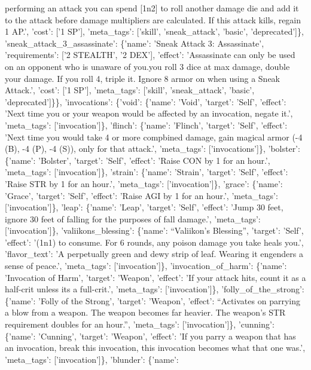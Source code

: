 \documentclass[
  letterpaper,
  DIV=11,
  numbers=noendperiod]{scrartcl}
\begin{document}
{performing an attack you can spend {[}1n2{]} to roll another damage die
and add it to the attack before damage multipliers are calculated. If
this attack kills, regain 1 AP.', 'cost': {[}'1 SP'{]}, 'meta\_tags':
{[}'skill', 'sneak\_attack', 'basic', 'deprecated'{]}\},
'sneak\_attack\_3\_assassinate': \{'name': 'Sneak Attack 3:
Assassinate', 'requirements': {[}'2 STEALTH', '2 DEX'{]}, 'effect':
'Assassinate can only be used on an opponent who is unaware of
you.\n\nIf you roll 3 dice at max damage, double your damage. If you
roll 4, triple it. Ignore 8 armor on when using a Sneak Attack.',
'cost': {[}'1 SP'{]}, 'meta\_tags': {[}'skill', 'sneak\_attack',
'basic', 'deprecated'{]}\}\}, 'invocations': \{'void': \{'name': 'Void',
'target': 'Self', 'effect': 'Next time you or your weapon would be
affected by an invocation, negate it.', 'meta\_tags':
{[}'invocation'{]}\}, 'flinch': \{'name': 'Flinch', 'target': 'Self',
'effect': 'Next time you would take 4 or more compbined damage, gain
magical armor (-4 (B), -4 (P), -4 (S)), only for that attack.',
'meta\_tags': {[}'invocations'{]}\}, 'bolster': \{'name': 'Bolster',
'target': 'Self', 'effect': 'Raise CON by 1 for an hour.', 'meta\_tags':
{[}'invocation'{]}\}, 'strain': \{'name': 'Strain', 'target': 'Self',
'effect': 'Raise STR by 1 for an hour.', 'meta\_tags':
{[}'invocation'{]}\}, 'grace': \{'name': 'Grace', 'target': 'Self',
'effect': 'Raise AGI by 1 for an hour.', 'meta\_tags':
{[}'invocation'{]}\}, 'leap': \{'name': 'Leap', 'target': 'Self',
'effect': 'Jump 30 feet, ignore 30 feet of falling for the purposes of
fall damage.', 'meta\_tags': {[}'invocation'{]}\},
'valiikons\_blessing': \{'name': ``Valiikon's Blessing'', 'target':
'Self', 'effect': '(1n1) to consume. For 6 rounds, any poison damage you
take heals you.', 'flavor\_text': 'A perpetually green and dewy strip of
leaf. Wearing it engenders a sense of peace.', 'meta\_tags':
{[}'invocation'{]}\}, 'invocation\_of\_harm': \{'name': 'Invocation of
Harm', 'target': 'Weapon', 'effect': 'If your attack hits, count it as a
half-crit unless its a full-crit.', 'meta\_tags': {[}'invocation'{]}\},
'folly\_of\_the\_strong': \{'name': 'Folly of the Strong', 'target':
'Weapon', 'effect': ``Activates on parrying a blow from a weapon. The
weapon becomes far heavier. The weapon's STR requirement doubles for an
hour.'', 'meta\_tags': {[}'invocation'{]}\}, 'cunning': \{'name':
'Cunning', 'target': 'Weapon', 'effect': 'If you parry a weapon that has
an invocation, break this invocation, this invocation becomes what that
one was.', 'meta\_tags': {[}'invocation'{]}\}, 'blunder': \{'name':
}
\end{document}
